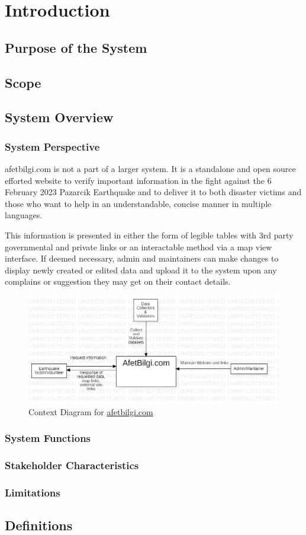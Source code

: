 \section{Introduction}

\subsection{Purpose of the System}

\subsection{Scope}

\subsection{System Overview}

\subsubsection{System Perspective}

afetbilgi.com \cite{afetbilgi} is not a part of a larger system. It is a standalone and open source efforted website to verify important information in the fight against the 6 February 2023 Pazarcik Earthquake and to deliver it to both disaster victims and those who want to help in an understandable, concise manner in multiple languages.

This information is presented in either the form of legible tables with 3rd party governmental and private links or an interactable method via a map view interface. If deemed necessary, admin and maintainers can make changes to display newly created or edited data and upload it to the system upon any complains or suggestion they may get on their contact details.

\begin{figure}[H]
  \centering
  \includegraphics[width=\textwidth]{img/context-diagram.jpg}
  \caption{Context Diagram for \href{https://afetbilgi.com}{afetbilgi.com}}
\end{figure}

\subsubsection{System Functions}

\subsubsection{Stakeholder Characteristics}

\subsubsection{Limitations}

\subsection{Definitions}
